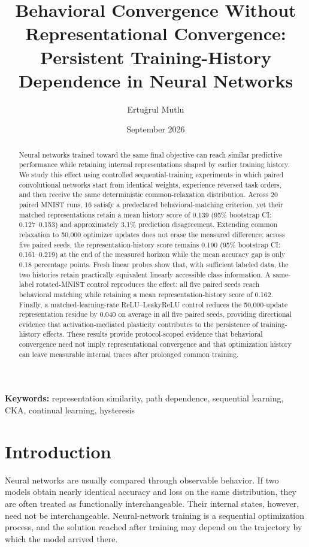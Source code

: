 \documentclass[11pt,a4paper]{article}
\title{\textbf{Behavioral Convergence Without Representational Convergence:}\\Persistent Training-History Dependence in Neural Networks}
\author{Ertu\u{g}rul Mutlu}
\affil{Aachen, Germany}
\date{September 2026}
\begin{document}
\maketitle

\begin{abstract}
Neural networks trained toward the same final objective can reach similar predictive performance while retaining internal representations shaped by earlier training history. We study this effect using controlled sequential-training experiments in which paired convolutional networks start from identical weights, experience reversed task orders, and then receive the same deterministic common-relaxation distribution. Across 20 paired MNIST runs, 16 satisfy a predeclared behavioral-matching criterion, yet their matched representations retain a mean history score of 0.139 (95\% bootstrap CI: 0.127--0.153) and approximately 3.1\% prediction disagreement. Extending common relaxation to 50,000 optimizer updates does not erase the measured difference: across five paired seeds, the representation-history score remains 0.190 (95\% bootstrap CI: 0.161--0.219) at the end of the measured horizon while the mean accuracy gap is only 0.18 percentage points. Fresh linear probes show that, with sufficient labeled data, the two histories retain practically equivalent linearly accessible class information. A same-label rotated-MNIST control reproduces the effect: all five paired seeds reach behavioral matching while retaining a mean representation-history score of 0.162. Finally, a matched-learning-rate ReLU--LeakyReLU control reduces the 50,000-update representation residue by 0.040 on average in all five paired seeds, providing directional evidence that activation-mediated plasticity contributes to the persistence of training-history effects. These results provide protocol-scoped evidence that behavioral convergence need not imply representational convergence and that optimization history can leave measurable internal traces after prolonged common training.
\end{abstract}

\textbf{Keywords:} representation similarity, path dependence, sequential learning, CKA, continual learning, hysteresis

\section{Introduction}

Neural networks are usually compared through observable behavior. If two models obtain nearly identical accuracy and loss on the same distribution, they are often treated as functionally interchangeable. Their internal states, however, need not be interchangeable. Neural-network training is a sequential optimization process, and the solution reached after training may depend on the trajectory by which the model arrived there.
\end{document}
